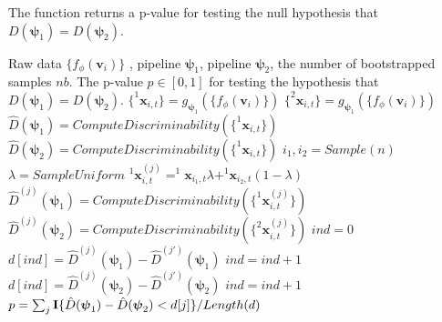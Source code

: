 \documentclass[simplex.tex]{subfiles}
\providecommand{\mb}[1]{\boldsymbol{#1}}
\providecommand{\ve}[1]{\boldsymbol{#1}}
\newcommand{\bpsi}{\ve{\psi}}
\newcommand{\bv}{\mb{v}}
\newcommand{\bx}{\mb{x}}
\begin{document}
\begin{algorithm}               
	\caption{The function returns a p-value for testing the null hypothesis that $D(\bpsi_1)=D(\bpsi_2)$.  }   
	\label{alg:tst}                       
	\begin{algorithmic}                    
		\Require Raw data $\{f_\phi(\bv_i)\}$ , pipeline $\bpsi_1$, pipeline $\bpsi_2$, the number of bootstrapped samples $nb$.
		\Ensure The p-value $p \in [0,1]$ for testing the hypothesis that $D(\bpsi_1)=D(\bpsi_2)$. 
		\State $\{^1\bx_{i,t}\}= g_{\bpsi_1}(\{f_\phi(\bv_i)\})$ 
		\State $\{^2\bx_{i,t}\}= g_{\bpsi_1}(\{f_\phi(\bv_i)\})$ 
		\State $\hat{D}(\bpsi_1)=ComputeDiscriminability(\{^1\bx_{i,t}\})$
		\State $\hat{D}(\bpsi_2)=ComputeDiscriminability(\{^1\bx_{i,t}\})$ 
		\State $i_1, i_2 = Sample(n)$ 
		\State $\lambda = SampleUniform$ 
		\State $^1\bx^{(j)}_{i,t} =  ^1\bx_{i_1,t} \lambda +   ^1\bx_{i_2,t}(1-\lambda)$ 
		\EndFor
		\EndFor
		\State $\hat{D}^{(j)}(\bpsi_1)=ComputeDiscriminability(\{^1\bx^{(j)}_{i,t}\})$
		\State $\hat{D}^{(j)}(\bpsi_2)=ComputeDiscriminability(\{^2\bx^{(j)}_{i,t}\})$
		\EndFor
		\State $ind = 0$
		 
		\State $d[ind] =  \hat{D}^{(j)}(\bpsi_1)-\hat{D}^{(j')}(\bpsi_1)$ 
		\State $ind = ind + 1$
		\State $d[ind] =  \hat{D}^{(j)}(\bpsi_2)-\hat{D}^{(j')}(\bpsi_2)$
		\State $ind = ind + 1$
		\EndFor
		\EndFor
		\State $p = \sum_j {\bf I}\{\hat{D}(\bpsi_1)-\hat{D}(\bpsi_2) < d[j]\} / Length(d)$ 
		\EndFunction
	\end{algorithmic}
\end{algorithm}

\clearpage
\end{document}
